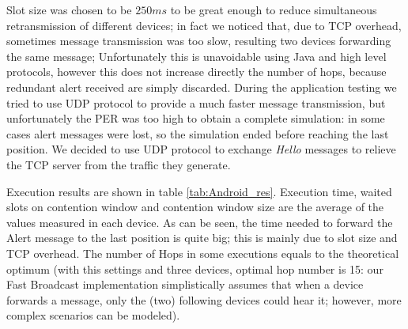 Slot size was chosen to be $250ms$ to be great enough to reduce simultaneous retransmission of different devices; in fact we noticed that, due to TCP overhead, sometimes message transmission was too slow, resulting two devices forwarding the same message; Unfortunately this is unavoidable using Java and high level protocols, however this does not increase directly the number of hops, because redundant alert received are simply discarded.
During the application testing we tried to use UDP protocol to provide a much faster message transmission, but unfortunately the PER was too high to obtain a complete simulation: in some cases alert messages were lost, so the simulation ended before reaching the last position. We decided to use UDP protocol to exchange \textit{Hello} messages to relieve the TCP server from the traffic they generate.

Execution results are shown in table \ref{tab:Android_res}. Execution time, waited slots on contention window and contention window size are the average of the values measured in each device. As can be seen, the time needed to forward the Alert message to the last position is quite big; this is mainly due to slot size and TCP overhead. The number of Hops in some executions equals to the theoretical optimum (with this settings and three devices, optimal hop number is 15: our Fast Broadcast implementation simplistically assumes that when a device forwards a message, only the (two) following devices could hear it; however, more complex scenarios can be modeled).

